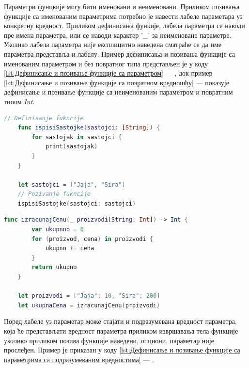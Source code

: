 \documentclass[12pt,oneside]{memoir}
\begin{document}
\indent Параметри фунцкије могу бити именовани и неименовани. Приликом позивања функције са именованим параметрима потребно је навести лабеле параметара уз конкретну вредност. Приликом дефинисања функије, лабела параметра се наводи пре имена параметра, или се наводи карактер '\_' за неименоване параметре. Уколико лабела параметра није експлицитно наведена сматраће се да име параметра представља и лабелу. Пример дефинисања и позивања функције са именованим параметром и без повратног типа представљен је у коду \ref{lst:Дефинисање и позивање функције са параметром} --- , док пример \ref{lst:Дефинисање и позивање функције са повратном вредношћу} ---  показује дефинисање и позивање функције са неименованим параметром и повратним типом \textit{Int}.

\begin{lstlisting}[caption=\textit{{Дефинисање и позивање функције са параметром}}, label={lst:Дефинисање и позивање функције са параметром}, language=Swift, frame=single]
    // Definisanje fukncije
    func ispisiSastojke(sastojci: [String]) {
        for sastojak in sastojci {
            print(sastojak)
        }
    }
    
    let sastojci = ["Jaja", "Sira"]
    // Pozivanje fukncije
    ispisiSastojke(sastojci: sastojci)
\end{lstlisting}

\begin{lstlisting}[caption=\textit{{Дефинисање и позивање функције са повратном вредношћу}}, label={lst:Дефинисање и позивање функције са повратном вредношћу}, language=Swift, frame=single]
    func izracunajCenu(_ proizvodi[String: Int]) -> Int {
        var ukupnno = 0
        for (proizvod, cena) in proizvodi {
            ukupno += cena
        }
        return ukupno
    }
    
    let proizvodi = ["Jaja": 10, "Sira": 200]
    let ukupnaCena = izracunajCenu(proizvodi)
\end{lstlisting}
    
\indent Поред лабеле уз параметар може стајати и подразумевана вредност параметра, која ће представљати вредност параметра приликом извршавања тела функције уколико приликом позива функције наведени, опциони, параметар није прослеђен. Пример је приказан у коду \ref{lst:Дефинисање и позивање функције са параметрима са подразумеваним вредностима} --- .
    
\end{document}
